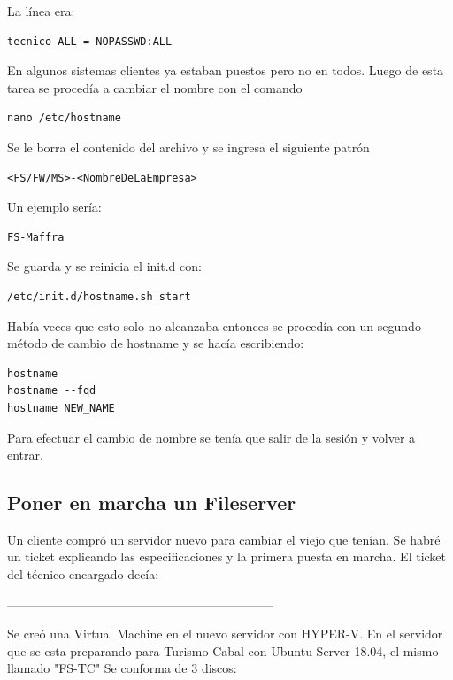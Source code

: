 \documentclass[12pt,a4paper]{article}
\begin{document}
La línea era:
\begin{lstlisting}
tecnico ALL = NOPASSWD:ALL
\end{lstlisting}

En algunos sistemas clientes ya estaban puestos pero no en todos. Luego de esta tarea se procedía a cambiar el nombre con el comando

\begin{lstlisting}
nano /etc/hostname
\end{lstlisting}

Se le borra el contenido del archivo y se ingresa el siguiente patrón

\begin{lstlisting}
<FS/FW/MS>-<NombreDeLaEmpresa>
\end{lstlisting}

Un ejemplo sería:

\begin{lstlisting}
FS-Maffra
\end{lstlisting}

Se guarda y se reinicia el init.d con:

\begin{lstlisting}
/etc/init.d/hostname.sh start
\end{lstlisting}

Había veces que esto solo no alcanzaba entonces se procedía con un segundo método de cambio de hostname y se hacía escribiendo:

\begin{lstlisting}
hostname
hostname --fqd
hostname NEW_NAME
\end{lstlisting}

Para efectuar el cambio de nombre se tenía que salir de la sesión y volver a entrar.

\subsection{Poner en marcha un Fileserver}
Un cliente compró un servidor nuevo para cambiar el viejo que tenían. Se habré un ticket explicando las especificaciones y la primera puesta en marcha. El ticket del técnico encargado decía: 

\begin{center}
-----------------------------------------------------------------
\end{center}

Se creó una Virtual Machine en el nuevo servidor con HYPER-V. En el servidor que se esta preparando para Turismo Cabal con Ubuntu Server 18.04, el mismo llamado "FS-TC" Se conforma de 3 discos:
\end{document}

